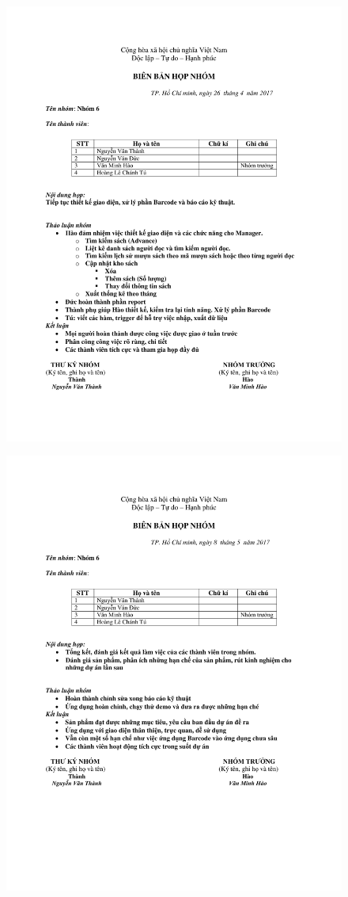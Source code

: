 \documentclass[12pt]{report}
\begin{document}
			\begin{figure}[H]
			\centering
			\includegraphics[scale=0.8]{images/hopnhomlan6.pdf}
			\end{figure}
			\begin{figure}[H]
			\centering
			\includegraphics[scale=0.8]{images/hopnhomlan7.pdf}
			\end{figure}
		
		
\end{document}
